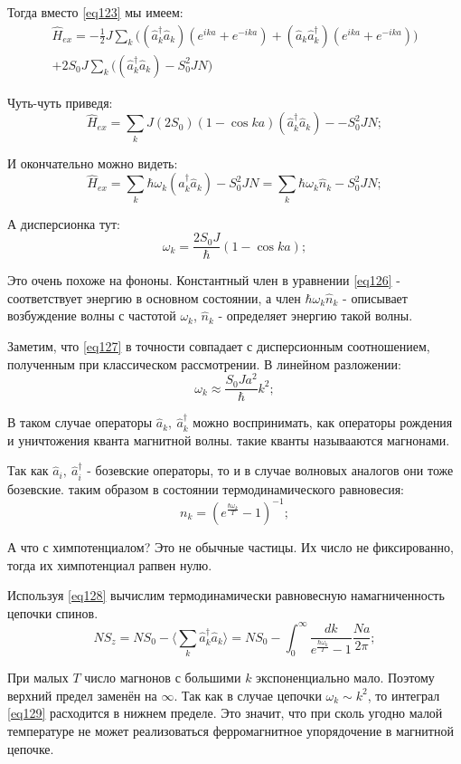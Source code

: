 \documentclass[a4paper, 14pt, russian]{article}
\newcommand{\be}{\begin{equation}}
\newcommand{\ee}{\end{equation}}
\begin{document}
	Тогда вместо \ref{eq123} мы имеем:
	\begin{multline}
		\label{eq124}
		\hat{H}_{ex} = - \frac{1}{2} J \sum_k \big((\hat{a}^\dagger_k \hat{a}_k)
		(e^{ika} + e^{-ika}) + (\hat{a}_k \hat{a}_k^\dagger)(e^{ika} + e^{-ika})\big)\\
		+ 2S_0 J \sum_k \big((\hat{a}_k^\dagger \hat{a}_k) - S_0^2 J N \big)
	\end{multline}

	Чуть-чуть приведя:
	\be
		\label{eq125}
		\hat{H}_{ex} = \sum_k  J(2S_0)(1 - \cos ka)(\hat{a}_k^\dagger \hat{a}_k) - 
			- S_0^2 J N;
	\ee

	И окончательно можно видеть:
	\be
		\label{eq126}
		\hat{H}_{ex} = \sum_k \hbar \omega_k (\hat{a}_k^\dagger \hat{a}_k)- S_0^2 J N = 
			\sum_k \hbar \omega_k \hat{n}_k - S_0^2 J N;
	\ee

	А дисперсионка тут:
	\be
		\label{eq127}
		\omega_k = \frac{2S_0 J}{\hbar}(1 - \cos ka);
	\ee

	Это очень похоже на фононы. Константный член в уравнении
	\ref{eq126} - соответствует энергию в основном состоянии,
	а член $\hbar \omega_k \hat{n}_k$ - описывает возбуждение волны
	с частотой $\omega_k$, $\hat{n}_k$ - определяет энергию
	такой волны.

	Заметим, что \ref{eq127} в точности совпадает с дисперсионным
	соотношением, полученным при классическом рассмотрении.
	В линейном разложении:
	\be
		\omega_k \approx \frac{S_0 J a^2}{\hbar} k^2;
	\ee 

	В таком случае операторы $\hat{a}_k,~\hat{a}_k^\dagger$ 
	можно воспринимать, как операторы рождения и уничтожения
	кванта магнитной волны. такие кванты называаются магнонами.

	Так как $\hat{a}_i,~\hat{a}_i^\dagger$ - бозевские операторы,
	то и в случае волновых аналогов они тоже бозевские.
	таким образом в состоянии термодинамического равновесия:
	\be
		\label{eq128}
		n_k = (e^{\frac{\hbar \omega_k}{T}} - 1)^{-1};
	\ee

	А что с химпотенциалом? Это не обычные частицы. Их число
	не фиксированно, тогда их химпотенциал рапвен нулю.

	Используя \ref{eq128} вычислим термодинамически равновесную
	намагниченность цепочки спинов.
	\be
		\label{eq129}
		NS_z = NS_0 - \langle \sum_k \hat{a}_k^\dagger \hat{a}_k \rangle
			= NS_0 - \int_0^\infty \frac{dk}{e^{\frac{\hbar \omega_k}{T}} - 1} \frac{Na}{2\pi};
	\ee

	При малых $T$  число магнонов с большими $k$ экспоненциально
	мало. Поэтому верхний предел заменён на $\infty$.  Так как
	в случае цепочки $\omega_k \sim k^2$, то интеграл \ref{eq129}
	расходится в нижнем пределе. Это значит,
	что  при сколь угодно малой температуре не может реализоваться
	ферромагнитное упорядочение в магнитной цепочке.
\end{document}
